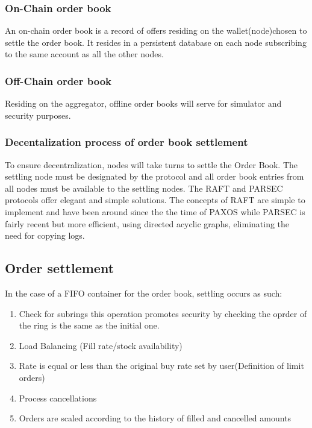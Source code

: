 \documentclass[]{article}
\begin{document}
\subsubsection{On-Chain order book}
An on-chain order book is a record of offers residing on the wallet(node)chosen to settle
the order book. It resides in a persistent database on each node subscribing 
to the same account as all the other nodes.

\subsubsection{Off-Chain order book}
Residing on the aggregator, offline order books will serve for simulator and security purposes.


\subsubsection{Decentalization process of order book settlement}
To ensure decentralization, nodes will take turns to settle the Order Book. 
The settling node must be designated by the protocol and all order book entries from all nodes must be available to the settling nodes. 
The RAFT\cite{18} and PARSEC\cite{23} protocols offer elegant and simple solutions. 
The concepts of RAFT are simple to implement and have been around since the the time of PAXOS\cite{24} 
while PARSEC is fairly recent but more efficient, using directed acyclic graphs, eliminating the need for copying logs.

\subsection{Order settlement}
In the case of a FIFO container for the order book,
settling occurs as such:
\begin{enumerate}
	\item Check for subrings
	this operation promotes security by checking the oprder of the ring is the same as the initial one.
	\item Load Balancing (Fill rate/stock availability)
	\item Rate is equal or less than the original buy rate set by user(Definition of limit orders)
	\item Process cancellations\\
	\item Orders are scaled according to the history of filled and cancelled amounts\\	 
\end{enumerate}	
	
\end{document}
